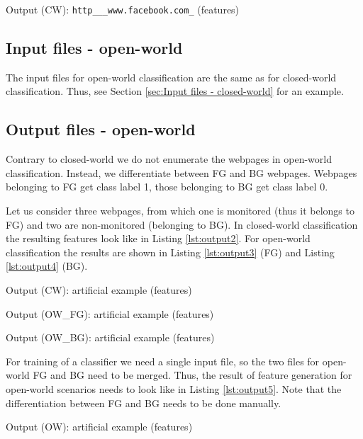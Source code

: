 \begin{listing}[h!]
\caption{Output (CW): \texttt{http\_\_\_www.facebook.com\_} (features)}

\label{lst:output1}
\end{listing}

\subsection{Input files - open-world}
The input files for open-world classification are the same as for closed-world classification. Thus, see Section \ref{sec:Input files - closed-world} for an example.

\subsection{Output files - open-world}
Contrary to closed-world we do not enumerate the webpages in open-world classification. Instead, we differentiate between \ac{FG} and \ac{BG} webpages. Webpages belonging to \ac{FG} get class label 1, those belonging to \ac{BG} get class label 0.

Let us consider three webpages, from which one is monitored (thus it belongs to \ac{FG}) and two are non-monitored (belonging to \ac{BG}). In closed-world classification the resulting features look like in Listing \ref{lst:output2}. For open-world classification the results are shown in Listing \ref{lst:output3} (\ac{FG}) and Listing \ref{lst:output4} (\ac{BG}).

\begin{listing}[h!]
\caption{Output (CW): artificial example (features)}

\label{lst:output2}
\end{listing}

\begin{listing}[h!]
\caption{Output (OW\_FG): artificial example (features)}

\label{lst:output3}
\end{listing}

\begin{listing}[ht!]
\caption{Output (OW\_BG): artificial example (features)}

\label{lst:output4}
\end{listing}

For training of a classifier we need a single input file, so the two files for open-world \ac{FG} and \ac{BG} need to be merged. Thus, the result of feature generation for open-world scenarios needs to look like in Listing \ref{lst:output5}. Note that the differentiation between \ac{FG} and \ac{BG} needs to be done manually.

\begin{listing}[ht!]
\caption{Output (OW): artificial example (features)}

\label{lst:output5}
\end{listing}